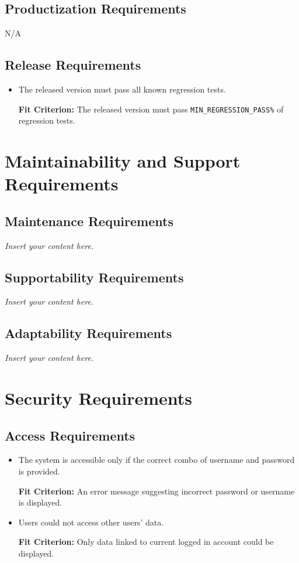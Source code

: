 \documentclass[12pt]{article}
\newcommand{\lips}{\textit{Insert your content here.}}
\newcounter{nfrnum} %
\newcommand{\rthenfrnum}{NFR\refstepcounter{nfrnum}\thenfrnum:}
\begin{document}
\subsection{Productization Requirements}
N/A
\subsection{Release Requirements}
\begin{itemize}
\item[\rthenfrnum]
The released version must pass all known regression tests.

\textbf{Fit Criterion:} The released version must pass \texttt{MIN\_REGRESSION\_PASS\%} of regression tests. 
\end{itemize}
\section{Maintainability and Support Requirements}
\subsection{Maintenance Requirements}
\lips
\subsection{Supportability Requirements}
\lips
\subsection{Adaptability Requirements}
\lips

\section{Security Requirements}
\subsection{Access Requirements}
\begin{itemize}
\item[\rthenfrnum]
The system is accessible only if the correct combo of username and password is provided.

\textbf{Fit Criterion:} An error message suggesting incorrect password or username is displayed.
\item[\rthenfrnum]
Users could not access other users' data.

\textbf{Fit Criterion:} Only data linked to current logged in account could be displayed.
\end{itemize}
\end{document}
